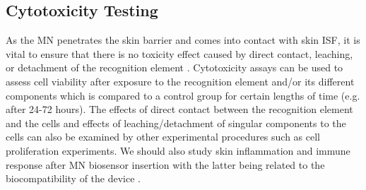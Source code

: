 \begin{appendices}
\subsection{Cytotoxicity Testing}
As the MN penetrates the skin barrier and comes into contact with skin ISF, it is vital to ensure that there is no toxicity effect caused by direct contact, leaching, or detachment of the recognition element \cite{GARCIAGUZMAN2021116148}. Cytotoxicity assays can be used to assess cell viability after exposure to the recognition element and/or its different components which is compared to a control group for certain lengths of time (e.g. after 24-72 hours). The effects of direct contact between the recognition element and the cells and effects of leaching/detachment of singular components to the cells can also be examined by other experimental procedures such as cell proliferation experiments. We should also study skin inflammation and immune response after MN biosensor insertion with the latter being related to the biocompatibility of the device \cite{kim2019continuous}.

\end{appendices}
